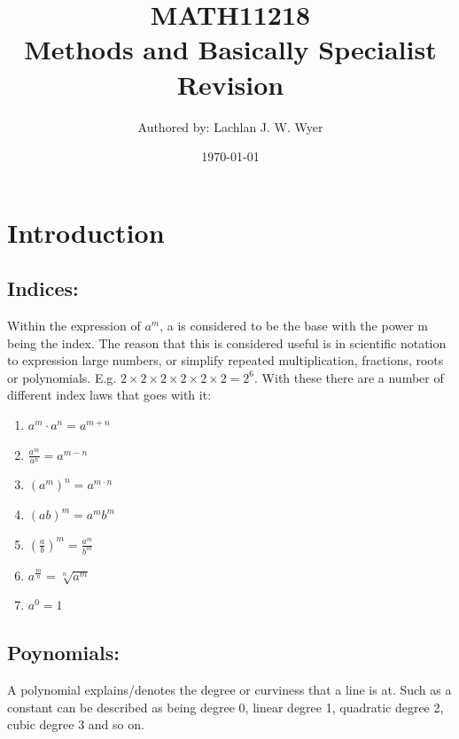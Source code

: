 \documentclass[a4paper]{article}
\title{MATH11218 \\ Methods and Basically Specialist Revision}
\author{Authored by: Lachlan J. W. Wyer}
\date{\today}
\begin{document}
	\maketitle
	\tableofcontents

	\section{Introduction}
	\subsection{Indices:}
	Within the expression of $a^{m}$, a is considered to be the base with the power m being the index. The reason that this is considered useful is in scientific notation to expression large numbers, or simplify repeated multiplication, fractions, roots or polynomials. E.g. $2\times 2\times 2\times 2\times 2\times 2=2^{6}$. With these there are a number of different index laws that goes with it:
	\begin{enumerate}
		\item $a^{m}\cdot a^{n}=a^{m+n}$
		\item $\frac{a^{m}}{a^{n}}=a^{m-n}$
		\item $(a^{m})^{n}=a^{m\cdot n}$
		\item $(ab)^{m} =a^{m}b^{m}$
		\item $(\frac{a}{b})^{m}=\frac{a^{m}}{b^{m}}$
		\item $a^{\frac{m}{n}}=\sqrt[n]{a^{m}}$
		\item $a^{0}=1$
	\end{enumerate}

	\subsection*{Poynomials:}
	A polynomial explains/denotes the degree or curviness that a line is at. Such as a constant can be described as being degree 0, linear degree 1, quadratic degree 2, cubic degree 3 and  so on.
\end{document}
